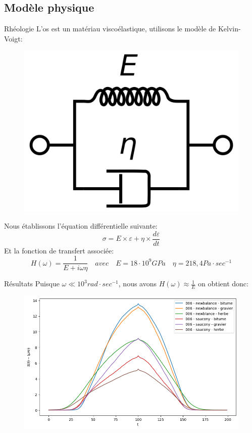 \subsection{Modèle physique}
\begin{frame}{Rhéologie}
    L'os est un matériau viscoélastique, utilisons le modèle de Kelvin-Voigt:
    \begin{figure}
        \includegraphics[scale=0.1]{./figures/rheo_00.png}
    \end{figure}
    Nous établissons l'équation différentielle suivante:
    $$ \sigma = E \times \varepsilon + \eta \times \frac{d\varepsilon}{dt}$$
    Et la fonction de transfert associée:
    $$ H(\omega) = \frac{1}{E+i\omega\eta} \quad avec \quad E=18 \cdot 10^9 GPa \quad \eta = 218,4 Pa \cdot sec^{-1}$$
\end{frame}
\begin{frame}{Résultats}
    Puisque $ \omega \ll 10^3 rad \cdot sec^{-1}$, nous avons $ H(\omega) \approx \frac{1}{E}$ on obtient donc:
    \begin{figure}
        \includegraphics[scale=0.5]{./figures/rheo_05.png}
    \end{figure}
\end{frame}
